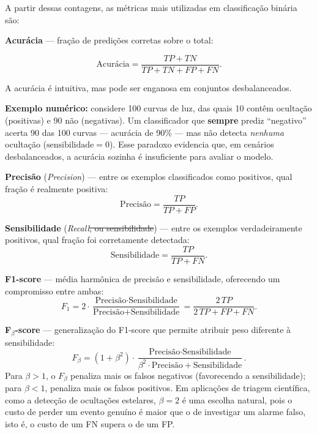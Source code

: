 \documentclass[msc]{on} %
\makeatletter
\providecommand{\DIFdeltex}[1]{{\protect\color{red}\sout{#1}}} %
\providecommand{\DIFdelbegin}{} %
\providecommand{\DIFdelend}{} %
\providecommand{\DIFdel}[1]{\texorpdfstring{\DIFdeltex{#1}}{}} %
\let\sout@orig\sout %
\renewcommand{\sout}[1]{\ifmmode\text{\sout@orig{\ensuremath{#1}}}\else\sout@orig{#1}\fi} %
\makeatother
\begin{document}
A partir dessas contagens, as métricas mais utilizadas em classificação binária são:

\textbf{Acurácia} --- fração de predições corretas sobre o total:

\begin{equation}
\text{Acurácia} = \frac{TP + TN}{TP + TN + FP + FN}.
\end{equation}

A acurácia é intuitiva, mas pode ser enganosa em conjuntos desbalanceados. 

\textbf{Exemplo numérico:} considere 100 curvas de luz, das quais 10 contêm ocultação (positivas) e 90 não (negativas). Um classificador que \textbf{sempre} prediz ``negativo'' acerta 90 das 100 curvas --- acurácia de 90\% --- mas não detecta \textit{nenhuma} ocultação ($\text{sensibilidade} = 0$). Esse paradoxo evidencia que, em cenários desbalanceados, a acurácia sozinha é insuficiente para avaliar o modelo.

\textbf{Precisão} (\textit{Precision}) --- entre os exemplos classificados como positivos, qual fração é realmente positiva:
\begin{equation}
\text{Precisão} = \frac{TP}{TP + FP}.
\end{equation}

\textbf{Sensibilidade} (\textit{Recall}\DIFdelbegin \DIFdel{, ou sensibilidade}\DIFdelend ) --- entre os exemplos verdadeiramente positivos, qual fração foi corretamente detectada:
\begin{equation}
\text{Sensibilidade} = \frac{TP}{TP + FN}.
\end{equation}

\textbf{F1-score} --- média harmônica de precisão e sensibilidade, oferecendo um compromisso entre ambas:
\begin{equation}
F_1 = 2 \cdot \frac{\text{Precisão} \cdot \text{Sensibilidade}}{\text{Precisão} + \text{Sensibilidade}} = \frac{2\,TP}{2\,TP + FP + FN}.
\end{equation}

\textbf{F$_\beta$-score} --- generalização do F1-score que permite atribuir peso diferente à sensibilidade:
\begin{equation}
F_\beta = (1 + \beta^2) \cdot \frac{\text{Precisão} \cdot \text{Sensibilidade}}{\beta^2 \cdot \text{Precisão} + \text{Sensibilidade}}.
\end{equation}
Para $\beta > 1$, o $F_\beta$ penaliza mais os falsos negativos (favorecendo a sensibilidade); para $\beta < 1$, penaliza mais os falsos positivos. Em aplicações de triagem científica, como a detecção de ocultações estelares, $\beta = 2$ é uma escolha natural, pois o custo de perder um evento genuíno é maior que o de investigar um alarme falso, isto é, o custo de um FN supera o de um FP.
\end{document}
